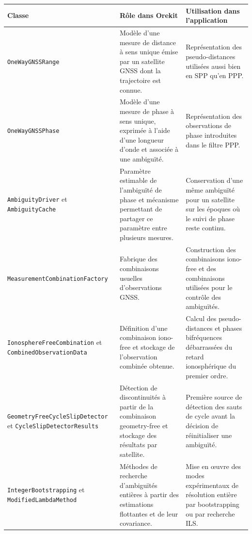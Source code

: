 \begin{table}[htbp]
\centering
\small
\begin{tabularx}{\textwidth}{|>{\raggedright\arraybackslash}p{}|
                                  >{\raggedright\arraybackslash}p{}|
                                  >{\raggedright\arraybackslash}X|}
\hline
\textbf{Classe} & \textbf{Rôle dans Orekit} &
\textbf{Utilisation dans l'application} \\
\hline
\texttt{OneWayGNSSRange} & Modèle d'une mesure de distance à sens unique émise
par un satellite GNSS dont la trajectoire est connue. & Représentation des
pseudo-distances utilisées aussi bien en SPP qu'en PPP. \\
\hline
\texttt{OneWayGNSSPhase} & Modèle d'une mesure de phase à sens unique, exprimée
à l'aide d'une longueur d'onde et associée à une ambiguïté. & Représentation
des observations de phase introduites dans le filtre PPP. \\
\hline
\texttt{AmbiguityDriver} et \texttt{AmbiguityCache} & Paramètre estimable de
l'ambiguïté de phase et mécanisme permettant de partager ce paramètre entre
plusieurs mesures. & Conservation d'une même ambiguïté pour un satellite sur
les époques où le suivi de phase reste continu. \\
\hline
\texttt{MeasurementCombination}\newline\texttt{Factory} & Fabrique des combinaisons usuelles
d'observations GNSS. & Construction des combinaisons iono-free et des
combinaisons utilisées pour le contrôle des ambiguïtés. \\
\hline
\texttt{IonosphereFreeCombination} et
\texttt{CombinedObservationData} & Définition d'une combinaison
iono-free et stockage de l'observation combinée obtenue. & Calcul des
pseudo-distances et phases bifréquences débarrassées du retard ionosphérique
du premier ordre. \\
\hline
\texttt{GeometryFreeCycleSlip}\newline\texttt{Detector} et
\texttt{CycleSlipDetectorResults} & Détection de discontinuités à partir de la
combinaison geometry-free et stockage des résultats par satellite. & Première
source de détection des sauts de cycle avant la décision de réinitialiser une
ambiguïté. \\
\hline
\texttt{IntegerBootstrapping} et \texttt{ModifiedLambdaMethod} & Méthodes de
recherche d'ambiguïtés entières à partir des estimations flottantes et de leur
covariance. & Mise en œuvre des modes expérimentaux de résolution entière par
bootstrapping ou par recherche ILS. \\

\end{tabularx}
\end{table}
